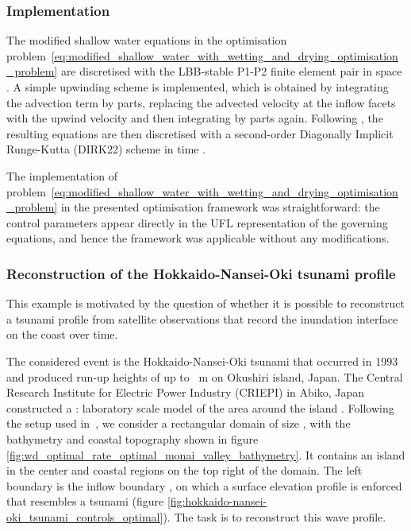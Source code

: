 \documentclass[prodmode,acmtoms]{acmsmall}
\newcommand{\ponedgptwo}{\mbox{P1-P2}\xspace}
\begin{document}
\subsubsection{Implementation}
The modified shallow water equations in the optimisation problem~\eqref{eq:modified_shallow_water_with_wetting_and_drying_optimisation_problem} are discretised 
with the LBB-stable \ponedgptwo finite element pair in space \cite{cotter2008b}.
A simple upwinding scheme is implemented, which is
obtained by integrating the advection term by parts, replacing the advected
velocity at the inflow facets with the upwind velocity and then integrating
by parts again.
Following , the resulting equations are then discretised with a second-order Diagonally Implicit Runge-Kutta (DIRK22) scheme in time \cite[\S 2.6]{ascher1997}.

The implementation of problem~\eqref{eq:modified_shallow_water_with_wetting_and_drying_optimisation_problem} 
in the presented optimisation framework was straightforward: 
the control parameters appear directly in the UFL representation of the governing equations,
and hence the framework was applicable without any modifications.

\subsubsection{Reconstruction of the Hokkaido-Nansei-Oki tsunami profile}
This example is motivated by the question of whether it is possible to reconstruct a tsunami profile from satellite observations that record the inundation interface on the coast over time. 

The considered event is the Hokkaido-Nansei-Oki tsunami that occurred in 1993 and produced run-up heights of up to ~m on Okushiri island, Japan. 
The Central Research Institute for Electric Power Industry (CRIEPI) in Abiko, Japan constructed a : laboratory scale model of the area around the island \cite{matsuyama2001}. 
Following the setup used in~, we consider a rectangular domain of size , 
with the bathymetry and coastal topography shown in figure \ref{fig:wd_optimal_rate_optimal_monai_valley_bathymetry}. 
It contains an island in the center and coastal regions on the top right of the domain.
The left boundary is the inflow boundary , on which a surface elevation profile is enforced that resembles a tsunami (figure \ref{fig:hokkaido-nansei-oki_tsunami_controls_optimal}). The task is to reconstruct this wave profile. 
\end{document}
